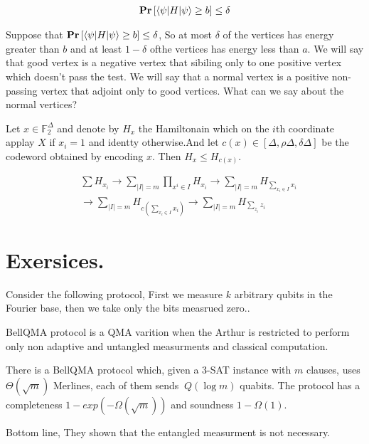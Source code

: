 \documentclass[manuscript,screen,review]{acmart}
\begin{document}
\begin{equation*}
  \begin{split}
    \mathbf{Pr} \left[ \braket{\psi|H|\psi} \ge b  \right] \le \delta  
  \end{split}
\end{equation*}

Suppose that $\mathbf{Pr} \left[ \braket{\psi|H|\psi} \ge b  \right] \le \delta $, So at most $\delta$ of the vertices has energy greater than $b$ and at least $1 - \delta$ ofthe vertices has energy less than $a$. We will say that good vertex is a negative vertex that sibiling only to one positive vertex which doesn't pass the test. We will say that a normal vertex is a  positive non-passing vertex that adjoint only to good vertices. What can we say about the normal vertices?  


\begin{claim}
  Let $x \in \mathbb{F}^{\Delta}_{2}$ and denote by $H_{x}$ the Hamiltonain which on the $i$th coordinate applay $X$ if $x_{i} = 1$ and identty otherwise.And let $c(x) \in [\Delta,\rho\Delta,\delta\Delta]$ be the codeword obtained by encoding $x$. Then $H_{x} \le H_{c(x)}$.  
\end{claim}

\begin{equation*}
  \begin{split}
    & \sum{ H_{x_{i}}} \rightarrow \sum_{|I|=m}{ \prod_{x^{i} \in I } H_{x_{i}}}\rightarrow\sum_{|I|=m}{  H_{ \sum_{x_{i}\in I} x_{i}}} \\
    & \rightarrow \sum_{|I|=m}{  H_{ c\left(\sum_{x_{i}\in I} x_{i}\right)} } \rightarrow \sum_{|I|=m}{  H_{ \sum_{z_{i}} z_{i}}}  
  \end{split}
\end{equation*}


% 
% 

\section{Exersices.}
\begin{exercise} Consider the following protocol, First we measure $k$ arbitrary qubits in the Fourier base, then we take only the bits measrued zero..  
\end{exercise}

\begin{definition}
  BellQMA protocol is a QMA varition when the Arthur is restricted to perform only non adaptive and untangled measurments and classical computation. 
\end{definition}
\begin{claim}
  There is a BellQMA protocol which, given a 3-SAT instance with $m$ clauses, uses $\Theta\left( \sqrt{m} \right)$ Merlines, each of them sends $~Q(\log m)$ quabits. The protocol has a completeness $ 1 - exp(-\Omega(\sqrt{m})) $ and soundness $ 1 - \Omega(1)$. 
\end{claim}
Bottom line, They shown that the entangled measurment is not necessary.  
\end{document}
